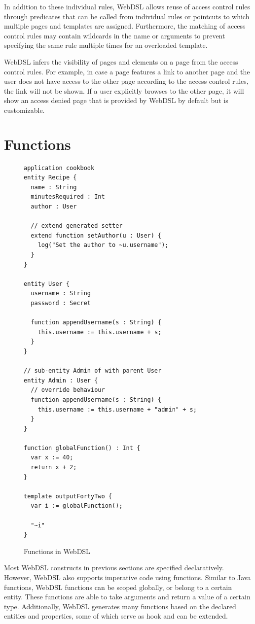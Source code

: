    In addition to these individual rules, WebDSL allows reuse of access control rules through predicates that can be called from individual rules or pointcuts to which multiple pages and templates are assigned. Furthermore, the matching of access control rules may contain wildcards in the name or arguments to prevent specifying the same rule multiple times for an overloaded template.

    WebDSL infers the visibility of pages and elements on a page from the access control rules. For example, in case a page features a link to another page and the user does not have access to the other page according to the access control rules, the link will not be shown. If a user explicitly browses to the other page, it will show an access denied page that is provided by WebDSL by default but is customizable.

  \section{\label{sec:functions}Functions}

  \begin{figure}
    \capstart
    \begin{verbatim}
application cookbook
entity Recipe {
  name : String
  minutesRequired : Int
  author : User

  // extend generated setter
  extend function setAuthor(u : User) {
    log("Set the author to ~u.username");
  }
}

entity User {
  username : String
  password : Secret

  function appendUsername(s : String) {
    this.username := this.username + s;
  }
}

// sub-entity Admin of with parent User
entity Admin : User {
  // override behaviour
  function appendUsername(s : String) {
    this.username := this.username + "admin" + s;
  }
}

function globalFunction() : Int {
  var x := 40;
  return x + 2;
}

template outputFortyTwo {
  var i := globalFunction();

  "~i"
}
    \end{verbatim}
    \caption{\label{fig:webdsl-functions}Functions in WebDSL}
  \end{figure}

    Most WebDSL constructs in previous sections are specified declaratively. However, WebDSL also supports imperative code using functions. Similar to Java functions, WebDSL functions can be scoped globally, or belong to a certain entity. These functions are able to take arguments and return a value of a certain type. Additionally, WebDSL generates many functions based on the declared entities and properties, some of which serve as hook and can be extended.

